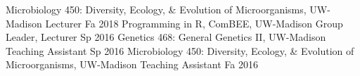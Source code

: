 

\begin{cvhonors}
  \cvhonor
    {Microbiology 450: Diversity, Ecology, \& Evolution of Microorganisms, UW-Madison}
    {Lecturer}
    {Fa 2018}
  \cvhonor
    {Programming in R, ComBEE, UW-Madison}
    {Group Leader, Lecturer}
    {Sp 2016}
  \cvhonor
    {Genetics 468: General Genetics II, UW-Madison}
    {Teaching Assistant}
    {Sp 2016}
  \cvhonor
    {Microbiology 450: Diversity, Ecology, \& Evolution of Microorganisms, UW-Madison}
    {Teaching Assistant}
    {Fa 2016}
\end{cvhonors}